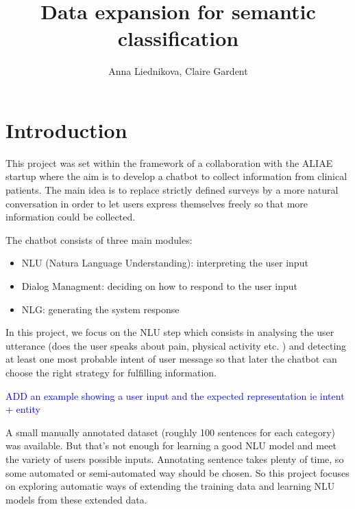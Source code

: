 \documentclass[11pt]{article}
\begin{document}
\newcommand\add[1]{{\textcolor{blue}{ #1}}}
\newcommand\modi[1]{{\textcolor{green}{MODIFIED: #1}}}
\newcommand\remove[1]{{\textcolor{red}{REMOVE: #1}}}
\newcommand\expand[1]{{\textcolor{blue}{EXPAND: #1}}}
\newcommand\rewrite[1]{{\textcolor{green}{REWRITE: #1}}}



\title{Data expansion for semantic classification}

\author{Anna Liednikova, Claire Gardent}




\maketitle

\tableofcontents

\clearpage

\section{Introduction}

 
This project was set within the framework of a collaboration with the
ALIAE startup where the aim is to develop a chatbot to collect
information from clinical patients. The main idea is to replace
strictly defined surveys by a more natural conversation in order to
let users express themselves freely so that more information could be
collected.

The chatbot consists of three main modules: 
\begin{itemize}
\item NLU (Natura Language Understanding): interpreting the user input
\item Dialog Managment: deciding on how to respond to the user input
\item NLG: generating the system response
\end{itemize}

In this project, we focus on the NLU step which consists in
analysing the user utterance (does the user speaks about pain,
physical activity etc. ) and detecting at least one most probable
intent of user message so that later the chatbot can choose the right
strategy for fulfilling information.

\add{ADD an example showing a user input and the expected representation ie intent + entity}

A small manually annotated dataset (roughly 100 sentences for each category) was available. But that's not enough for learning a good NLU model and meet the variety of users possible inputs. Annotating sentence takes plenty of time, so some automated or semi-automated way should be chosen. So this project focuses on exploring automatic ways of extending the training data and learning NLU models from these extended data.
\end{document}
